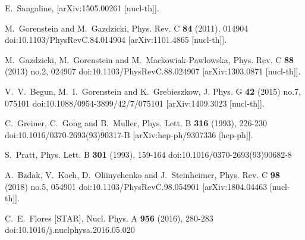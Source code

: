 \begin{thebibliography}{99}
E.~Sangaline,
[arXiv:1505.00261 [nucl-th]].

M.~Gorenstein and M.~Gazdzicki,
Phys. Rev. C \textbf{84} (2011), 014904
doi:10.1103/PhysRevC.84.014904
[arXiv:1101.4865 [nucl-th]].

M.~Gazdzicki, M.~Gorenstein and M.~Mackowiak-Pawlowska,
Phys. Rev. C \textbf{88} (2013) no.2, 024907
doi:10.1103/PhysRevC.88.024907
[arXiv:1303.0871 [nucl-th]].

V.~V.~Begun, M.~I.~Gorenstein and K.~Grebieszkow,
J. Phys. G \textbf{42} (2015) no.7, 075101
doi:10.1088/0954-3899/42/7/075101
[arXiv:1409.3023 [nucl-th]].

C.~Greiner, C.~Gong and B.~Muller,
Phys. Lett. B \textbf{316} (1993), 226-230
doi:10.1016/0370-2693(93)90317-B
[arXiv:hep-ph/9307336 [hep-ph]].

S.~Pratt,
Phys. Lett. B \textbf{301} (1993), 159-164
doi:10.1016/0370-2693(93)90682-8

A.~Bzdak, V.~Koch, D.~Oliinychenko and J.~Steinheimer,
Phys. Rev. C \textbf{98} (2018) no.5, 054901
doi:10.1103/PhysRevC.98.054901
[arXiv:1804.04463 [nucl-th]].

C.~E.~Flores [STAR],
Nucl. Phys. A \textbf{956} (2016), 280-283
doi:10.1016/j.nuclphysa.2016.05.020


\end{thebibliography}
